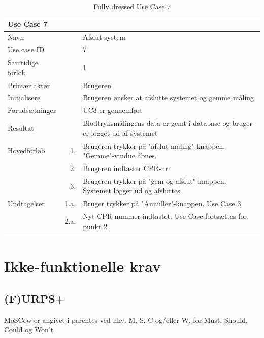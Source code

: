 \begin{longtabu} to  %
    {\large \textbf{Use Case 7}} && \\
    \toprule
    Navn &&    Afslut system\\
    Use case ID &&    7\\
    Samtidige forløb &&    1\\
    Primær aktør &&    Brugeren\\
    Initialisere &&    Brugeren ønsker at afslutte systemet og gemme måling\\
    Forudsætninger && UC3 er gennemført\\
    Resultat &&    Blodtryksmålingens data er gemt i database og bruger er logget ud af systemet                    \\ \midrule
    Hovedforløb &    1. &    Brugeren trykker på "afslut måling"\--knappen. "Gemme"\--vindue åbnes. \\  						 	
                &    2. & Brugeren indtaster CPR-nr. 	\\
                &    3. & Brugeren trykker på "gem og afslut"\--knappen. Systemet logger ud og afsluttes\\ \midrule                
    Undtagelser &    1.a. & Bruger trykker på "Annuller"\--knappen. Use Case 3 \\ 
    			&	2.a. &  Nyt CPR-nummer indtastet. Use Case fortsættes for punkt 2\\ \bottomrule
    		
\caption{Fully dressed Use Case 7}
\label{UC7}
\end{longtabu}

\section{Ikke-funktionelle krav}
\subsection{(F)URPS+}
MoSCow er angivet i parentes ved hhv. M, S, C og/eller W, for Must, Should, Could og Won't\\


